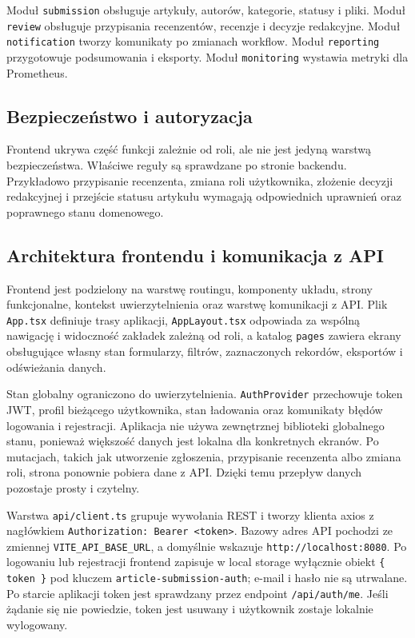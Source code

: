 \documentclass[times]{san}
\begin{document}
Moduł \texttt{submission} obsługuje artykuły, autorów, kategorie, statusy i pliki. Moduł \texttt{review} obsługuje przypisania recenzentów, recenzje i decyzje redakcyjne. Moduł \texttt{notification} tworzy komunikaty po zmianach workflow. Moduł \texttt{reporting} przygotowuje podsumowania i eksporty. Moduł \texttt{monitoring} wystawia metryki dla Prometheus.

\subsection{Bezpieczeństwo i autoryzacja}

Frontend ukrywa część funkcji zależnie od roli, ale nie jest jedyną warstwą bezpieczeństwa. Właściwe reguły są sprawdzane po stronie backendu. Przykładowo przypisanie recenzenta, zmiana roli użytkownika, złożenie decyzji redakcyjnej i przejście statusu artykułu wymagają odpowiednich uprawnień oraz poprawnego stanu domenowego.

\subsection{Architektura frontendu i komunikacja z API}

Frontend jest podzielony na warstwę routingu, komponenty układu, strony funkcjonalne, kontekst uwierzytelnienia oraz warstwę komunikacji z API. Plik \texttt{App.tsx} definiuje trasy aplikacji, \texttt{AppLayout.tsx} odpowiada za wspólną nawigację i widoczność zakładek zależną od roli, a katalog \texttt{pages} zawiera ekrany obsługujące własny stan formularzy, filtrów, zaznaczonych rekordów, eksportów i odświeżania danych.

Stan globalny ograniczono do uwierzytelnienia. \texttt{AuthProvider} przechowuje token JWT, profil bieżącego użytkownika, stan ładowania oraz komunikaty błędów logowania i rejestracji. Aplikacja nie używa zewnętrznej biblioteki globalnego stanu, ponieważ większość danych jest lokalna dla konkretnych ekranów. Po mutacjach, takich jak utworzenie zgłoszenia, przypisanie recenzenta albo zmiana roli, strona ponownie pobiera dane z API. Dzięki temu przepływ danych pozostaje prosty i czytelny.

Warstwa \texttt{api/client.ts} grupuje wywołania REST i tworzy klienta axios z nagłówkiem \texttt{Authorization: Bearer <token>}. Bazowy adres API pochodzi ze zmiennej \texttt{VITE\_API\_BASE\_URL}, a domyślnie wskazuje \texttt{http://localhost:8080}. Po logowaniu lub rejestracji frontend zapisuje w local storage wyłącznie obiekt \texttt{\{ token \}} pod kluczem \texttt{article-submission-auth}; e-mail i hasło nie są utrwalane. Po starcie aplikacji token jest sprawdzany przez endpoint \texttt{/api/auth/me}. Jeśli żądanie się nie powiedzie, token jest usuwany i użytkownik zostaje lokalnie wylogowany.
\end{document}
